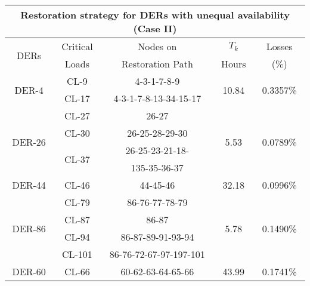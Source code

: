 \documentclass[12pt]{article}
\begin{document}
\begin{table}[t]
\begin{tabular}{c|c|c|c|c}
			
			\multicolumn{5}{c}{    Restoration strategy for DERs with unequal availability (Case II)}\\
			\toprule[0.4 mm]
			\hline
			\multirow{2}{*}{DERs} & Critical & Nodes on &$T_k$& Losses\\
			&Loads&Restoration Path &Hours& (\%)\\
			\hline
			\hline
			\multirow{2}{*}{DER-4}& CL-9& 4-3-1-7-8-9& \multirow{2}{*}{10.84}&\multirow{2}{*}{0.3357\%}\\
			&CL-17&4-3-1-7-8-13-34-15-17& & \\
			\hline
			\multirow{4}{*}{DER-26}& CL-27& 26-27& \multirow{4}{*}{5.53}&\multirow{4}{*}{0.0789\%}\\
			&CL-30&26-25-28-29-30& & \\
			&\multirow{2}{*}{CL-37}&26-25-23-21-18-& & \\
			&&135-35-36-37& & \\
			\hline
			\multirow{1}{*}{DER-44}& CL-46& 44-45-46& \multirow{1}{*}{32.18}&\multirow{1}{*}{0.0996\%}\\
			\hline
			\multirow{4}{*}{DER-86}& CL-79& 86-76-77-78-79& \multirow{4}{*}{5.78}&\multirow{4}{*}{0.1490\%}\\
			&CL-87&86-87& & \\
			&CL-94&86-87-89-91-93-94& & \\
			&CL-101&86-76-72-67-97-197-101& & \\
			\hline
			\multirow{1}{*}{DER-60}& CL-66& 60-62-63-64-65-66& \multirow{1}{*}{43.99}&\multirow{1}{*}{0.1741\%}\\
			\toprule[0.4 mm]
			

\end{tabular}
\end{table}
\end{document}
